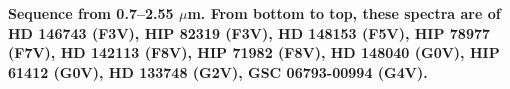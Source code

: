 {\bf Sequence from 0.7–2.55 $\mu$m. From bottom to top, these spectra are of HD 146743 (F3V), HIP 82319 (F3V), HD 148153 (F5V), HIP 78977 (F7V), HD 142113 (F8V), HIP 71982 (F8V), HD 148040 (G0V), HIP 61412 (G0V), HD 133748 (G2V), GSC 06793-00994 (G4V). \label{fig:stack-plot-c}}